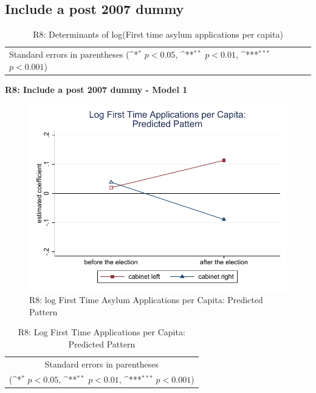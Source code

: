 \documentclass[10pt,a4paper]{scrartcl}
\begin{document}


\clearpage
\FloatBarrier
\subsection{Include a post 2007 dummy}
\begin{table}[!ht]\centering
	\renewcommand{\arraystretch}{1.25}
	\small
	\def\sym#1{\ifmmode^{#1}\else\(^{#1}\)\fi}
	\caption{R8: Determinants of log(First time asylum applications per capita)}
	\begin{tabular}{l*{2}{c}}
		\hline\hline
		
		\hline\hline
		\multicolumn{3}{l}{\footnotesize Standard errors in parentheses (\sym{*} \(p<0.05\), \sym{**} \(p<0.01\), \sym{***} \(p<0.001\))}\\
	\end{tabular}
\end{table}

\clearpage
\textbf{R8: Include a post 2007 dummy - Model 1}
\begin{figure}[!ht]
	\centering
	\includegraphics[width=1\textwidth]{figures_edited/app_graph1_R8.pdf}
	\caption{R8: log First Time Asylum Applications per Capita: Predicted Pattern}
\end{figure}

\begin{table}[!ht]\centering
	\renewcommand{\arraystretch}{1.25}
	\def\sym#1{\ifmmode^{#1}\else\(^{#1}\)\fi}
	\caption{R8: Log First Time Applications per Capita: Predicted Pattern}
	\begin{tabular}{l*{2}{c}}
		\hline\hline
		
		\hline\hline
		\multicolumn{3}{c}{\footnotesize Standard errors in parentheses} \\
		\multicolumn{3}{c}{\footnotesize (\sym{*} \(p<0.05\), \sym{**} \(p<0.01\), \sym{***} \(p<0.001\))}\\
	\end{tabular}
\end{table}
\end{document}
